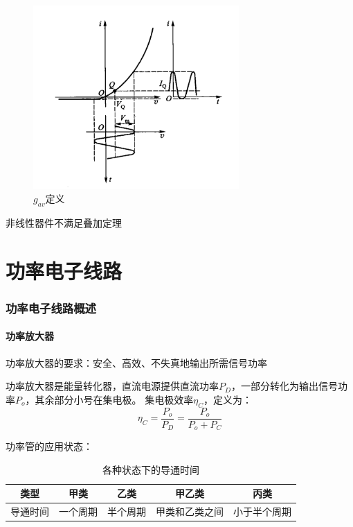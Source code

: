 \documentclass[10pt]{article}
\begin{document}
   \begin{figure}[H] %
    \centering %
    \includegraphics[width=0.7\textwidth]{pictures/1-3.png} %
    \caption{$g_{av}$定义} %
    \end{figure}

 非线性器件不满足叠加定理

\newpage
\part{功率电子线路}
\section{功率电子线路概述}
\subsection{功率放大器}
功率放大器的要求：安全、高效、不失真地输出所需信号功率\par
功率放大器是能量转化器，直流电源提供直流功率$P_D$，一部分转化为输出信号功率$P_o$，其余部分小号在集电极。
集电极效率$\eta_C$，定义为：
$$
\eta_C = \frac{P_o}{P_D} = \frac{P_o}{P_o + P_C}
$$

功率管的应用状态：
\begin{table}[h]
    \centering
    \begin{tabular}{|c|c|c|c|c|}
    \hline
    类型 & 甲类 & 乙类 & 甲乙类&丙类 \\
    \hline
    导通时间 & 一个周期 & 半个周期 &甲类和乙类之间& 小于半个周期 \\
    \hline
    \end{tabular}
    \caption{各种状态下的导通时间}
    \label{tab:example}
\end{table}
\end{document}
